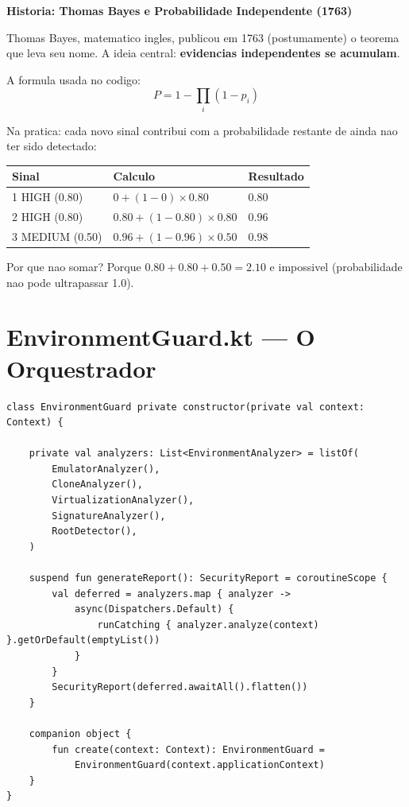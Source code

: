 \documentclass[12pt,a4paper]{article}
\begin{document}
\begin{historybox}
\textbf{Historia: Thomas Bayes e Probabilidade Independente (1763)}

Thomas Bayes, matematico ingles, publicou em 1763 (postumamente) o teorema
que leva seu nome. A ideia central: \textbf{evidencias independentes se acumulam}.

A formula usada no codigo:
$$P = 1 - \prod_{i}(1 - p_i)$$

Na pratica: cada novo sinal contribui com a probabilidade restante de ainda
nao ter sido detectado:

\begin{center}
\begin{tabular}{lll}
\toprule
Sinal & Calculo & Resultado \\
\midrule
1 HIGH (0.80) & $0 + (1-0) \times 0.80$ & $0.80$ \\
2 HIGH (0.80) & $0.80 + (1-0.80) \times 0.80$ & $0.96$ \\
3 MEDIUM (0.50) & $0.96 + (1-0.96) \times 0.50$ & $0.98$ \\
\bottomrule
\end{tabular}
\end{center}

Por que nao somar? Porque $0.80 + 0.80 + 0.50 = 2.10$ e impossivel
(probabilidade nao pode ultrapassar 1.0).
\end{historybox}

\newpage

\section{EnvironmentGuard.kt --- O Orquestrador}

\begin{lstlisting}
class EnvironmentGuard private constructor(private val context: Context) {

    private val analyzers: List<EnvironmentAnalyzer> = listOf(
        EmulatorAnalyzer(),
        CloneAnalyzer(),
        VirtualizationAnalyzer(),
        SignatureAnalyzer(),
        RootDetector(),
    )

    suspend fun generateReport(): SecurityReport = coroutineScope {
        val deferred = analyzers.map { analyzer ->
            async(Dispatchers.Default) {
                runCatching { analyzer.analyze(context) }.getOrDefault(emptyList())
            }
        }
        SecurityReport(deferred.awaitAll().flatten())
    }

    companion object {
        fun create(context: Context): EnvironmentGuard =
            EnvironmentGuard(context.applicationContext)
    }
}
\end{lstlisting}
\end{document}
